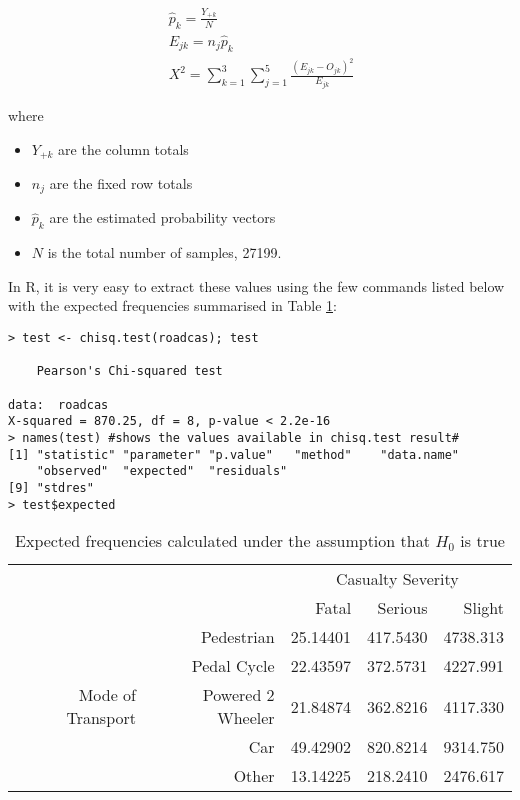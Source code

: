 \documentclass[11pt,a4]{article}
\begin{document}
\begin{enumerate}
\begin{align}
\ \hat{p}_{k} = \frac{Y_{+k}}{N}\\
\ E_{jk} = n_{j}\hat{p}_{k}\\
\ X^2 = \sum_{k=1}^3 \sum_{j=1}^5 \frac{(E_{jk} - O_{jk})^2}{E_{jk}}
\end{align}

where 
\begin{itemize}
    \item $Y_{+k}$ are the column totals
    \item $n_{j}$ are the fixed row totals
    \item $\hat{p}_{k}$ are the estimated probability vectors
    \item $N$ is the total number of samples, 27199.
\end{itemize}
 
In R, it is very easy to extract these values using the few commands listed below with the expected frequencies summarised in Table \ref{tab3}:

\begin{verbatim}
> test <- chisq.test(roadcas); test

	Pearson's Chi-squared test

data:  roadcas
X-squared = 870.25, df = 8, p-value < 2.2e-16
> names(test) #shows the values available in chisq.test result#
[1] "statistic" "parameter" "p.value"   "method"    "data.name" 
    "observed"  "expected"  "residuals"
[9] "stdres"   
> test$expected
\end{verbatim}

\begin{table}[ht]
\centering
\begin{tabular}{rr|rrr}
    \multicolumn{2}{c}{\multirow{2}{*}{}}&\multicolumn{3}{|c}{Casualty Severity} \\
    \multicolumn{2}{c|}{}& Fatal & Serious & Slight\\
  \hline
  \multirow{5}{*}{Mode of Transport} & Pedestrian & 25.14401 & 417.5430 & 4738.313\\ 
  & Pedal Cycle &  22.43597 & 372.5731 & 4227.991 \\ 
  & Powered 2 Wheeler & 21.84874 & 362.8216 & 4117.330 \\ 
  & Car & 49.42902 & 820.8214 & 9314.750 \\ 
  & Other & 13.14225 & 218.2410 & 2476.617 \\ 
   \hline
\end{tabular}
\caption{Expected frequencies calculated under the assumption that $H_{0}$ is true}
\label{tab3}
\end{table}


\end{enumerate}
\end{document}
